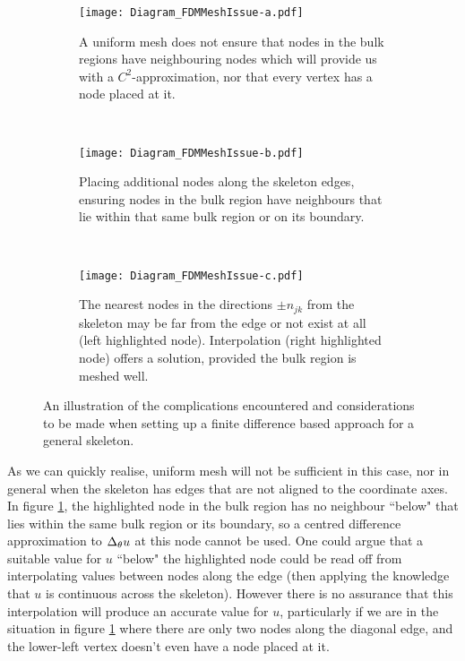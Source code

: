\begin{figure}[t]
	\centering
	\begin{subfigure}[t]{0.3\textwidth}
		\centering
		\texttt{[image: Diagram\_FDMMeshIssue-a.pdf]}
		\caption{\label{fig:Diagram_FDMMeshIssue-a} A uniform mesh does not ensure that nodes in the bulk regions have neighbouring nodes which will provide us with a $C^2$-approximation, nor that every vertex has a node placed at it.}
	\end{subfigure}
	~
	\begin{subfigure}[t]{0.3\textwidth}
		\centering
		\texttt{[image: Diagram\_FDMMeshIssue-b.pdf]}
		\caption{\label{fig:Diagram_FDMMeshIssue-b} Placing additional nodes along the skeleton edges, ensuring nodes in the bulk region have neighbours that lie within that same bulk region or on its boundary.}
	\end{subfigure}
	~
	\begin{subfigure}[t]{0.3\textwidth}
		\centering
		\texttt{[image: Diagram\_FDMMeshIssue-c.pdf]}
		\caption{\label{fig:Diagram_FDMMeshIssue-c} The nearest nodes in the directions $\pm n_{jk}$ from the skeleton may be far from the edge or not exist at all (left highlighted node). Interpolation (right highlighted node) offers a solution, provided the bulk region is meshed well.}
	\end{subfigure}
	\caption{\label{fig:Diagram_FDMMeshIssue} An illustration of the complications encountered and considerations to be made when setting up a finite difference based approach for a general skeleton.}
\end{figure}
As we can quickly realise, uniform mesh will not be sufficient in this case, nor in general when the skeleton has edges that are not aligned to the coordinate axes. 
In figure \ref{fig:Diagram_FDMMeshIssue-a}, the highlighted node in the bulk region has no neighbour ``below" that lies within the same bulk region or its boundary, so a centred difference approximation to $\Delta_{\theta}u$ at this node cannot be used.
One could argue that a suitable value for $u$ ``below" the highlighted node could be read off from interpolating values between nodes along the edge (then applying the knowledge that $u$ is continuous across the skeleton).
However there is no assurance that this interpolation will produce an accurate value for $u$, particularly if we are in the situation in figure \ref{fig:Diagram_FDMMeshIssue-a} where there are only two nodes along the diagonal edge, and the lower-left vertex doesn't even have a node placed at it.
